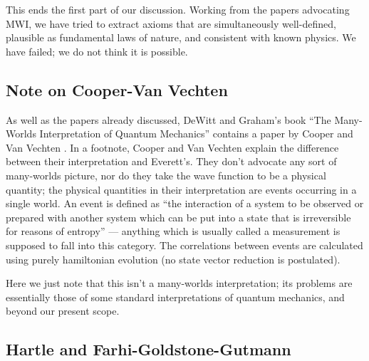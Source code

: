 \documentclass[aps,pra,12pt]{revtex4}
\begin{document}
This ends the first part of our discussion.  
Working from the papers advocating MWI, we have tried to extract axioms that 
are simultaneously well-defined, plausible as fundamental laws of nature,
and consistent with known physics.
We have failed; we do not think it is possible.

\subsection{Note on Cooper-Van Vechten}

As well as the papers already discussed, DeWitt and Graham's book \cite{mwbook} 
``The Many-Worlds Interpretation of Quantum Mechanics''
contains a paper by Cooper and Van Vechten \cite{cvv}.
In a footnote, Cooper and Van Vechten explain the difference between
their interpretation and Everett's.  
They don't advocate any sort of many-worlds picture, nor do they take  
the wave function to be a physical quantity; the physical quantities
in their interpretation are events occurring in a single world. 
An event is defined 
as ``the interaction of a system to be observed or prepared with another system
which can be put into a state that is irreversible for reasons of entropy'' ---
anything which is usually called a measurement is supposed to fall into this
category. The correlations between events are calculated using purely
hamiltonian evolution (no state vector reduction is postulated). 

Here we just note that this isn't a many-worlds interpretation; its 
problems are essentially those of some standard interpretations of quantum 
mechanics, and beyond our present scope. 

\subsection{Hartle and Farhi-Goldstone-Gutmann} 
\end{document}
